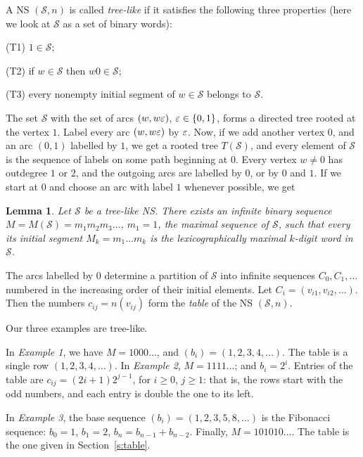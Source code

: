 \documentclass[12pt]{article}
\newtheorem{lemma}[theorem]{Lemma}
\begin{document}
\medbreak

A NS $(\mathcal{S},n)$ is called {\it tree-like} if it satisfies the following
three properties (here we look at $\mathcal{S}$ as a set of binary words):
\begin{description}
\item{(T1)} $1\in\mathcal{S}$;
\item{(T2)} if $w\in\mathcal{S}$ then $w0\in\mathcal{S}$;
\item{(T3)} every nonempty initial segment of $w\in\mathcal{S}$ belongs to 
$\mathcal{S}$.
\end{description}

The set $\mathcal{S}$ with the set of arcs $(w,w\varepsilon)$, $\varepsilon\in\{0,1\}$, forms a
directed tree rooted at the vertex $1$. Label every arc $(w,w\varepsilon)$ by
$\varepsilon$. Now, if we add another vertex $0$, and an arc $(0,1)$ labelled by $1$,
we get a rooted tree $T(\mathcal{S})$, and every element of $\mathcal{S}$
is the sequence of labels on some path beginning at $0$. Every vertex
$w\neq 0$ has outdegree $1$ or $2$, and the outgoing arcs are labelled by
$0$, or by $0$ and $1$. If we start at $0$ and choose an arc with label $1$
whenever possible, we get

\begin{lemma}\label{l1}
Let $\mathcal{S}$ be a tree-like NS. There exists an infinite binary sequence
$M=M(\mathcal{S})=m_1m_2m_3\ldots$, $m_1=1$, the {\em maximal sequence} of 
$\mathcal{S}$, such that every its initial segment $M_k=m_1\ldots m_k$
is the lexicographically maximal $k$-digit word in $\mathcal{S}$.
\end{lemma}

The arcs labelled by $0$ determine a partition of $\mathcal{S}$ into infinite
sequences $C_0,C_1,\ldots$ numbered in the increasing order of their
initial elements. Let $C_i=(v_{i1},v_{i2},\ldots)$. Then the numbers
$c_{ij}=n(v_{ij})$ form the \emph{table} of the NS $(\mathcal{S},n)$.

\medbreak

Our three examples are tree-like.

In \emph{Example 1}, we have $M=1000\ldots$, and $(b_i)=(1,2,3,4,\ldots)$.
The table is a single row $(1,2,3,4,\ldots)$. In \emph{Example 2},
$M=1111\ldots$; and $b_i=2^i$. Entries of the table are $c_{ij}=(2i+1)2^{j-1}$,
for $i\geq 0$, $j\geq 1$: that is, the rows start with the odd numbers, and
each entry is double the one to its left.

In \emph{Example 3}, the base sequence $(b_i)=(1,2,3,5,8,\ldots)$
is the Fibonacci sequence: $b_0=1$, $b_1=2$, $b_n=b_{n-1}+b_{n-2}$.
Finally, $M=101010\ldots$. The table is the one given in Section~\ref{s:table}.
\end{document}
